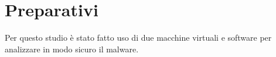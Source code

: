 \documentclass[12pt,oneside]{fithesis2}
\begin{document}
        
        
        
        \clearpage
    \chapter*{Preparativi}
    Per questo studio è stato fatto uso di due macchine virtuali e software per analizzare in modo sicuro il malware.
        
\end{document}
